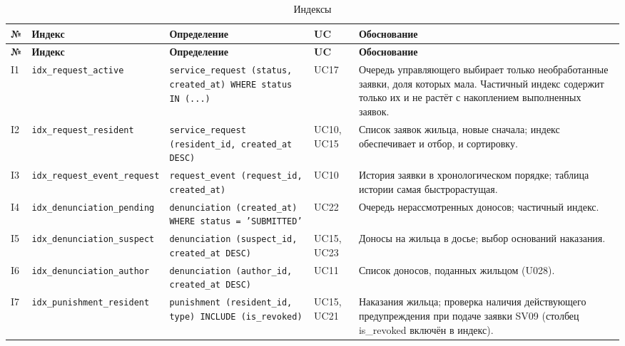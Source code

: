\documentclass[12pt,a4paper]{article}
\begin{document}
\begin{longtable}{L{8.3mm} L{38.9mm} L{48.1mm} L{15.7mm} L{37.0mm}}
\caption{Индексы}\label{tab:indexes}\\
\toprule \textbf{№} & \textbf{Индекс} & \textbf{Определение} & \textbf{UC} & \textbf{Обоснование} \\ \midrule
\endfirsthead
\toprule \textbf{№} & \textbf{Индекс} & \textbf{Определение} & \textbf{UC} & \textbf{Обоснование} \\ \midrule
\endhead
\bottomrule
\endfoot
I1 & \texttt{idx\_\allowbreak{}request\_\allowbreak{}active} & \texttt{\footnotesize service\_\allowbreak{}request (status, created\_\allowbreak{}at) WHERE status IN (...)} & UC17 & Очередь управляющего выбирает только необработанные заявки, доля которых мала. Частичный индекс содержит только их и не растёт с накоплением выполненных заявок. \\
I2 & \texttt{idx\_\allowbreak{}request\_\allowbreak{}resident} & \texttt{\footnotesize service\_\allowbreak{}request (resident\_\allowbreak{}id, created\_\allowbreak{}at DESC)} & UC10, UC15 & Список заявок жильца, новые сначала; индекс обеспечивает и отбор, и сортировку. \\
I3 & \texttt{idx\_\allowbreak{}request\_\allowbreak{}event\_\allowbreak{}request} & \texttt{\footnotesize request\_\allowbreak{}event (request\_\allowbreak{}id, created\_\allowbreak{}at)} & UC10 & История заявки в хронологическом порядке; таблица истории самая быстрорастущая. \\
I4 & \texttt{idx\_\allowbreak{}denunciation\_\allowbreak{}pending} & \texttt{\footnotesize denunciation (created\_\allowbreak{}at) WHERE status = 'SUBMITTED'} & UC22 & Очередь нерассмотренных доносов; частичный индекс. \\
I5 & \texttt{idx\_\allowbreak{}denunciation\_\allowbreak{}suspect} & \texttt{\footnotesize denunciation (suspect\_\allowbreak{}id, created\_\allowbreak{}at DESC)} & UC15, UC23 & Доносы на жильца в досье; выбор оснований наказания. \\
I6 & \texttt{idx\_\allowbreak{}denunciation\_\allowbreak{}author} & \texttt{\footnotesize denunciation (author\_\allowbreak{}id, created\_\allowbreak{}at DESC)} & UC11 & Список доносов, поданных жильцом (U028). \\
I7 & \texttt{idx\_\allowbreak{}punishment\_\allowbreak{}resident} & \texttt{\footnotesize punishment (resident\_\allowbreak{}id, type) INCLUDE (is\_\allowbreak{}revoked)} & UC15, UC21 & Наказания жильца; проверка наличия действующего предупреждения при подаче заявки SV09 (столбец is\_\allowbreak{}revoked включён в индекс). \\

\end{longtable}
\end{document}
